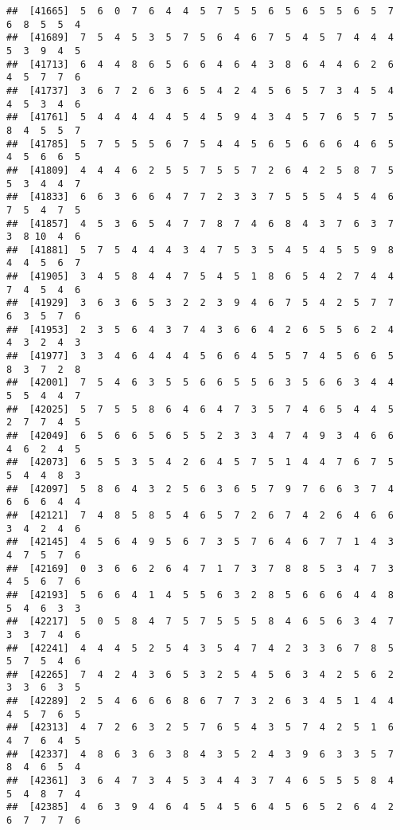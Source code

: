 \documentclass[
]{book}
\begin{document}
\begin{verbatim}
##  [41665]  5  6  0  7  6  4  4  5  7  5  5  6  5  6  5  5  6  5  7  6  8  5  5  4
##  [41689]  7  5  4  5  3  5  7  5  6  4  6  7  5  4  5  7  4  4  4  5  3  9  4  5
##  [41713]  6  4  4  8  6  5  6  6  4  6  4  3  8  6  4  4  6  2  6  4  5  7  7  6
##  [41737]  3  6  7  2  6  3  6  5  4  2  4  5  6  5  7  3  4  5  4  4  5  3  4  6
##  [41761]  5  4  4  4  4  4  5  4  5  9  4  3  4  5  7  6  5  7  5  8  4  5  5  7
##  [41785]  5  7  5  5  5  6  7  5  4  4  5  6  5  6  6  6  4  6  5  4  5  6  6  5
##  [41809]  4  4  4  6  2  5  5  7  5  5  7  2  6  4  2  5  8  7  5  5  3  4  4  7
##  [41833]  6  6  3  6  6  4  7  7  2  3  3  7  5  5  5  4  5  4  6  7  5  4  7  5
##  [41857]  4  5  3  6  5  4  7  7  8  7  4  6  8  4  3  7  6  3  7  3  8 10  4  6
##  [41881]  5  7  5  4  4  4  3  4  7  5  3  5  4  5  4  5  5  9  8  4  4  5  6  7
##  [41905]  3  4  5  8  4  4  7  5  4  5  1  8  6  5  4  2  7  4  4  7  4  5  4  6
##  [41929]  3  6  3  6  5  3  2  2  3  9  4  6  7  5  4  2  5  7  7  6  3  5  7  6
##  [41953]  2  3  5  6  4  3  7  4  3  6  6  4  2  6  5  5  6  2  4  4  3  2  4  3
##  [41977]  3  3  4  6  4  4  4  5  6  6  4  5  5  7  4  5  6  6  5  8  3  7  2  8
##  [42001]  7  5  4  6  3  5  5  6  6  5  5  6  3  5  6  6  3  4  4  5  5  4  4  7
##  [42025]  5  7  5  5  8  6  4  6  4  7  3  5  7  4  6  5  4  4  5  2  7  7  4  5
##  [42049]  6  5  6  6  5  6  5  5  2  3  3  4  7  4  9  3  4  6  6  4  6  2  4  5
##  [42073]  6  5  5  3  5  4  2  6  4  5  7  5  1  4  4  7  6  7  5  5  4  4  8  3
##  [42097]  5  8  6  4  3  2  5  6  3  6  5  7  9  7  6  6  3  7  4  6  6  6  4  4
##  [42121]  7  4  8  5  8  5  4  6  5  7  2  6  7  4  2  6  4  6  6  3  4  2  4  6
##  [42145]  4  5  6  4  9  5  6  7  3  5  7  6  4  6  7  7  1  4  3  4  7  5  7  6
##  [42169]  0  3  6  6  2  6  4  7  1  7  3  7  8  8  5  3  4  7  3  4  5  6  7  6
##  [42193]  5  6  6  4  1  4  5  5  6  3  2  8  5  6  6  6  4  4  8  5  4  6  3  3
##  [42217]  5  0  5  8  4  7  5  7  5  5  5  8  4  6  5  6  3  4  7  3  3  7  4  6
##  [42241]  4  4  4  5  2  5  4  3  5  4  7  4  2  3  3  6  7  8  5  5  7  5  4  6
##  [42265]  7  4  2  4  3  6  5  3  2  5  4  5  6  3  4  2  5  6  2  3  3  6  3  5
##  [42289]  2  5  4  6  6  6  8  6  7  7  3  2  6  3  4  5  1  4  4  4  5  7  6  5
##  [42313]  4  7  2  6  3  2  5  7  6  5  4  3  5  7  4  2  5  1  6  4  7  6  4  5
##  [42337]  4  8  6  3  6  3  8  4  3  5  2  4  3  9  6  3  3  5  7  8  4  6  5  4
##  [42361]  3  6  4  7  3  4  5  3  4  4  3  7  4  6  5  5  5  8  4  5  4  8  7  4
##  [42385]  4  6  3  9  4  6  4  5  4  5  6  4  5  6  5  2  6  4  2  6  7  7  7  6

\end{verbatim}
\end{document}

